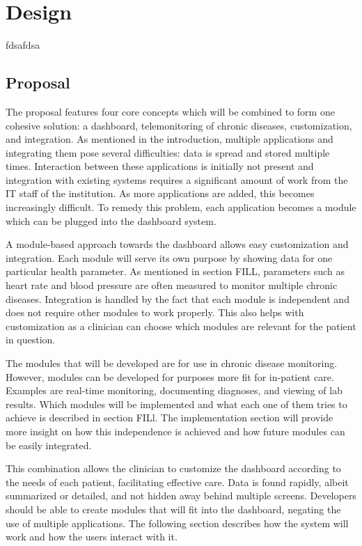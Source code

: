 \section{Design}\label{design}

fdsafdsa

    \subsection{Proposal}
    
    The proposal features four core concepts which will be combined to form one cohesive solution: a dashboard, telemonitoring of chronic diseases, customization, and integration. As mentioned in the introduction, multiple applications and integrating them pose several difficulties: data is spread and stored multiple times. Interaction between these applications is initially not present and integration with existing systems requires a significant amount of work from the IT staff of the institution. As more applications are added, this becomes increasingly difficult. To remedy this problem, each application becomes a module which can be plugged into the dashboard system.

    A module-based approach towards the dashboard allows easy customization and integration. Each module will serve its own purpose by showing data for one particular health parameter. As mentioned in section FILL, parameters such as heart rate and blood pressure are often measured to monitor multiple chronic diseases. Integration is handled by the fact that each module is independent and does not require other modules to work properly. This also helps with customization as a clinician can choose which modules are relevant for the patient in question. %

    The modules that will be developed are for use in chronic disease monitoring. However, modules can be developed for purposes more fit for in-patient care. Examples are real-time monitoring, documenting diagnoses, and viewing of lab results. Which modules will be implemented and what each one of them tries to achieve is described in section FILl. The implementation section will provide more insight on how this independence is achieved and how future modules can be easily integrated. %

    This combination allows the clinician to customize the dashboard according to the needs of each patient, facilitating effective care. Data is found rapidly, albeit summarized or detailed, and not hidden away behind multiple screens. Developers should be able to create modules that will fit into the dashboard, negating the use of multiple applications. The following section describes how the system will work and how the users interact with it.

